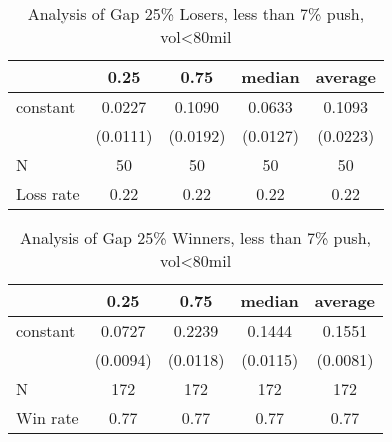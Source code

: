 \documentclass{article}
\begin{document}
\begin{table}
\caption{Analysis of Gap 25\% Losers, less than 7\% push, vol<80mil}
\begin{center}
\begin{tabular}{lcccc}
\hline
          &   0.25   &   0.75   &  median  & average   \\
\midrule
\midrule
constant  & 0.0227   & 0.1090   & 0.0633   & 0.1093    \\
          & (0.0111) & (0.0192) & (0.0127) & (0.0223)  \\
N         & 50       & 50       & 50       & 50        \\
Loss rate & 0.22     & 0.22     & 0.22     & 0.22      \\
\hline
\end{tabular}
\end{center}
\end{table}

\begin{table}
\caption{Analysis of Gap 25\% Winners, less than 7\% push, vol<80mil}
\begin{center}
\begin{tabular}{lcccc}
\hline
         &   0.25   &   0.75   &  median  & average   \\
\midrule
\midrule
constant & 0.0727   & 0.2239   & 0.1444   & 0.1551    \\
         & (0.0094) & (0.0118) & (0.0115) & (0.0081)  \\
N        & 172      & 172      & 172      & 172       \\
Win rate & 0.77     & 0.77     & 0.77     & 0.77      \\
\hline
\end{tabular}
\end{center}
\end{table}
\end{document}
